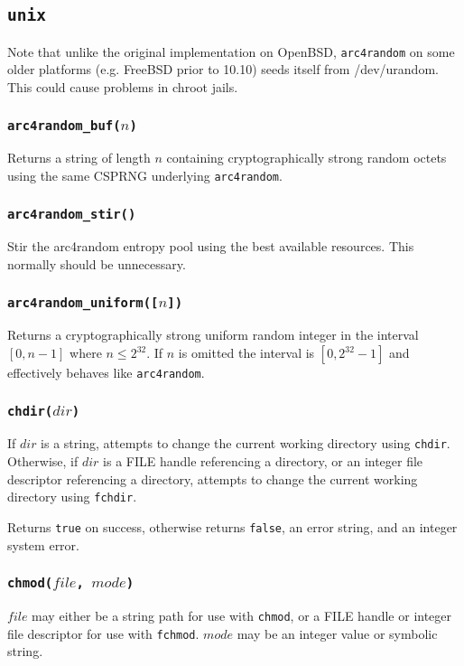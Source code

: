\documentclass[11pt, oneside]{memoir}
\newcommand*{\true}[0]{\texttt{true}\xspace}
\newcommand*{\false}[0]{\texttt{false}\xspace}
\newcommand*{\syscall}[1]{\texttt{#1}\xspace}
\newcommand*{\fn}[1]{\texttt{#1}\xspace}
\newcounter{toccols}
\newenvironment{Module}[1]{
	\subsection{\texttt{#1}}
	\addtocontents{toc}{
		\protect\begin{multicols}{\value{toccols}}
	}
}{
	\addtocontents{toc}{\protect\end{multicols}}
}
\begin{document}
\begin{Module}{unix}
Note that unlike the original implementation on OpenBSD, \fn{arc4random} on some older platforms (e.g. FreeBSD prior to 10.10) seeds itself from /dev/urandom. This could cause problems in chroot jails.

\subsubsection[\fn{arc4random\_buf}]{\fn{arc4random\_buf($n$)}}

Returns a string of length $n$ containing cryptographically strong random octets using the same CSPRNG underlying \fn{arc4random}.

\subsubsection[\fn{arc4random\_stir}]{\fn{arc4random\_stir()}}

Stir the arc4random entropy pool using the best available resources. This normally should be unnecessary.

\subsubsection[\fn{arc4random\_uniform}]{\fn{arc4random\_uniform([$n$])}}

Returns a cryptographically strong uniform random integer in the interval $[0, n-1]$ where $n \leq 2^{32}$. If $n$ is omitted the interval is $[0, 2^{32}-1]$ and effectively behaves like \fn{arc4random}.

\subsubsection[\fn{chdir}]{\fn{chdir($dir$)}}

If $dir$ is a string, attempts to change the current working directory using \syscall{chdir}. Otherwise, if $dir$ is a FILE handle referencing a directory, or an integer file descriptor referencing a directory, attempts to change the current working directory using \syscall{fchdir}.

Returns \true on success, otherwise returns \false, an error string, and an integer system error.

\subsubsection[\fn{chmod}]{\fn{chmod($file$, $mode$)}}

$file$ may either be a string path for use with \syscall{chmod}, or a FILE handle or integer file descriptor for use with \syscall{fchmod}. $mode$ may be an integer value or symbolic string.


\end{Module}
\end{document}
